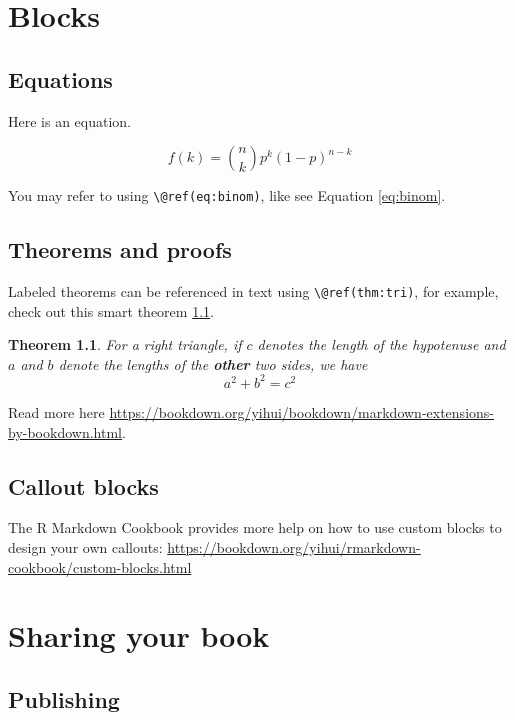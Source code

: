 \documentclass[
]{book}
\newtheorem{theorem}{Theorem}[chapter]
\theoremstyle{definition}
\theoremstyle{definition}
\theoremstyle{definition}
\theoremstyle{definition}
\theoremstyle{remark}
\begin{document}
\chapter{Blocks}\label{blocks}

\section{Equations}\label{equations}

Here is an equation.

\begin{equation} 
  f\left(k\right) = \binom{n}{k} p^k\left(1-p\right)^{n-k}
  \label{eq:binom}
\end{equation}

You may refer to using \texttt{\textbackslash{}@ref(eq:binom)}, like see Equation \eqref{eq:binom}.

\section{Theorems and proofs}\label{theorems-and-proofs}

Labeled theorems can be referenced in text using \texttt{\textbackslash{}@ref(thm:tri)}, for example, check out this smart theorem \ref{thm:tri}.

\begin{theorem}
\protect\hypertarget{thm:tri}{}\label{thm:tri}For a right triangle, if \(c\) denotes the \emph{length} of the hypotenuse
and \(a\) and \(b\) denote the lengths of the \textbf{other} two sides, we have
\[a^2 + b^2 = c^2\]
\end{theorem}

Read more here \url{https://bookdown.org/yihui/bookdown/markdown-extensions-by-bookdown.html}.

\section{Callout blocks}\label{callout-blocks}

The R Markdown Cookbook provides more help on how to use custom blocks to design your own callouts: \url{https://bookdown.org/yihui/rmarkdown-cookbook/custom-blocks.html}

\chapter{Sharing your book}\label{sharing-your-book}

\section{Publishing}\label{publishing}
\end{document}
